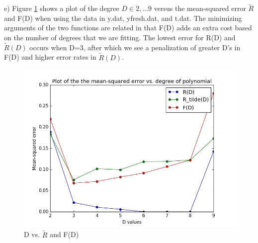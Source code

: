 \documentclass[11pt]{article}
\newenvironment{problem}[2][Problem]{\begin{trivlist}
\item[\hskip \labelsep {\bfseries #1}\hskip \labelsep {\bfseries #2.}]}{\end{trivlist}}
\begin{document}
\begin{problem}{2.1}
(e) Figure \ref{fig:2e} shows a plot of the degree $D \in {2,...9}$ versus the mean-squared error $\tilde{R}$ and F(D) when using the data in y.dat, yfresh.dat, and t.dat. The minimizing arguments of the two functions are related in that F(D) adds an extra cost based on the number of degrees that we are fitting. The lowest error for R(D) and $\tilde{R}(D)$ occurs when D=3, after which we see a penalization of greater D's in F(D) and higher error rates in $\tilde{R}(D)$. 
\begin{figure}[h!]
  \centering
  \includegraphics[scale=0.5]{figs/2e_2.png}
  \caption{D vs. $\tilde{R}$ and F(D)}
  \label{fig:2e}
\end{figure}

\end{problem}
 
\end{document}
